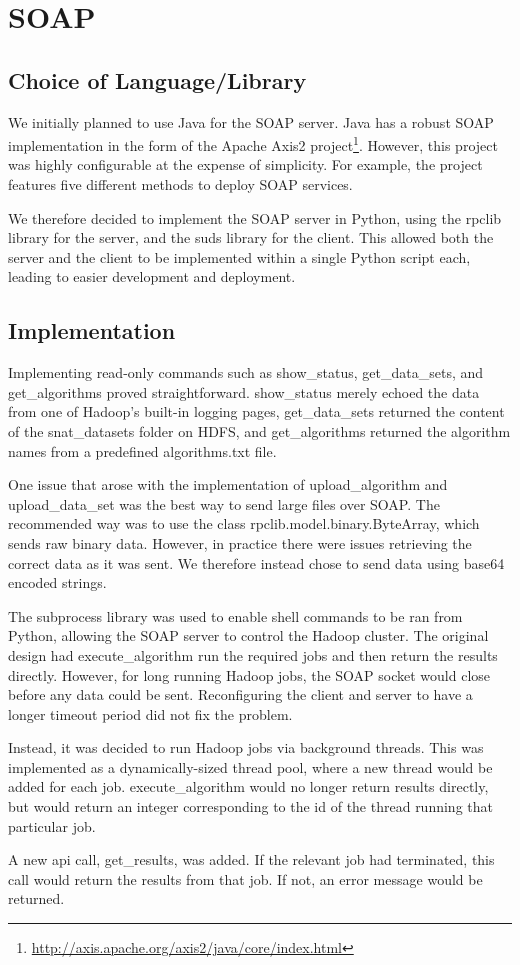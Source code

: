\section{SOAP}

\subsection{Choice of Language/Library}

We initially planned to use Java for the SOAP server. Java has a robust SOAP implementation in the form of the Apache Axis2 project\footnote{\url{http://axis.apache.org/axis2/java/core/index.html}}. However, this project was highly configurable at the expense of simplicity. For example, the project features five different methods to deploy SOAP services.

We therefore decided to implement the SOAP server in Python, using the rpclib library for the server, and the suds library for the client. This allowed both the server and the client to be implemented within a single Python script each, leading to easier development and deployment.

\subsection{Implementation}

Implementing read-only commands such as show\_status, get\_data\_sets, and get\_algorithms proved straightforward. show\_status merely echoed the data from one of Hadoop's built-in logging pages, get\_data\_sets returned the content of the snat\_datasets folder on HDFS, and get\_algorithms returned the algorithm names from a predefined algorithms.txt file.

One issue that arose with the implementation of upload\_algorithm and upload\_data\_set was the best way to send large files over SOAP. The recommended way was to use the class rpclib.model.binary.ByteArray, which sends raw binary data. However, in practice there were issues retrieving the correct data as it was sent. We therefore instead chose to send data using base64 encoded strings.

The subprocess library was used to enable shell commands to be ran from Python, allowing the SOAP server to control the Hadoop cluster. The original design had execute\_algorithm run the required jobs and then return the results directly. However, for long running Hadoop jobs, the SOAP socket would close before any data could be sent. Reconfiguring the client and server to have a longer timeout period did not fix the problem.

Instead, it was decided to run Hadoop jobs via background threads. This was implemented as a dynamically-sized thread pool, where a new thread would be added for each job. execute\_algorithm would no longer return results directly, but would return an integer corresponding to the id of the thread running that particular job.

A new api call, get\_results, was added. If the relevant job had terminated, this call would return the results from that job. If not, an error message would be returned.
